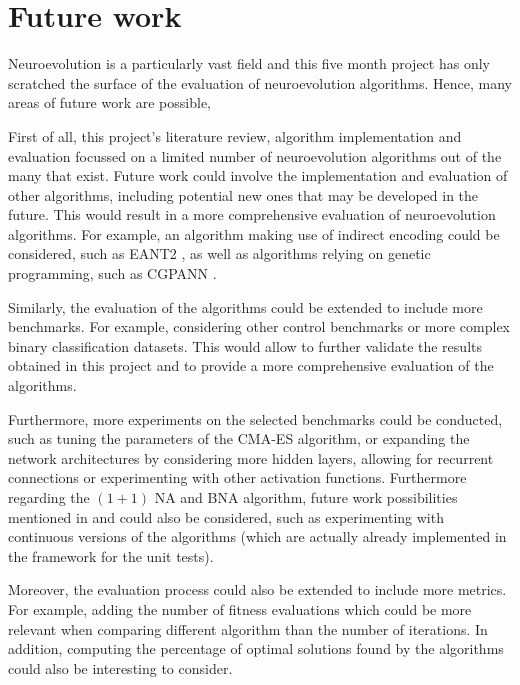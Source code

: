 \chapter{Future work}
\label{chap:future_work}


Neuroevolution is a particularly vast field and this five month project has only scratched the surface of the evaluation of neuroevolution algorithms. Hence, many areas of future work are possible,

First of all, this project's literature review, algorithm implementation and evaluation focussed on a limited number of neuroevolution algorithms out of the many that exist. Future work could involve
the implementation and evaluation of other algorithms, including potential new ones that may be developed in the future. This would result in a more comprehensive evaluation of neuroevolution algorithms.
For example, an algorithm making use of indirect encoding could be considered, such as EANT2 \cite{eant2}, as well as algorithms relying on genetic programming, such as CGPANN \cite{cgpann} .

Similarly, the evaluation of the algorithms could be extended to include more benchmarks. For example, considering other control benchmarks or more complex binary classification datasets.
This would allow to further validate the results obtained in this project and to provide a more comprehensive evaluation of the algorithms.

Furthermore, more experiments on the selected benchmarks could be conducted, such as tuning the parameters of the CMA-ES algorithm, or expanding the network architectures by considering more
hidden layers, allowing for recurrent connections or experimenting with other activation functions. Furthermore regarding the $(1 + 1)$ NA and BNA algorithm, future work possibilities mentioned
in \cite{na} and \cite{bna} could also be considered, such as experimenting with continuous versions of the algorithms (which are actually already implemented in the framework for the unit tests).

Moreover, the evaluation process could also be extended to include more metrics. For example, adding the number of fitness evaluations which could be more relevant when comparing different algorithm
than the number of iterations. In addition, computing the percentage of optimal solutions found by the algorithms could also be interesting to consider.

